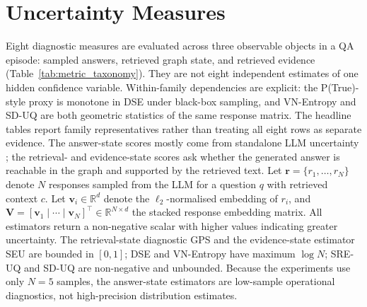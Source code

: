 \section{Uncertainty Measures}
\label{sec:metrics}

Eight diagnostic measures are evaluated across three observable objects in a
QA episode: sampled answers, retrieved graph state, and retrieved evidence
(Table~\ref{tab:metric_taxonomy}).
They are not eight independent estimates of one hidden confidence variable.
Within-family dependencies are explicit: the P(True)-style proxy is monotone
in DSE under black-box sampling, and VN-Entropy and SD-UQ are both geometric
statistics of the same response matrix.
The headline tables report family representatives rather than treating all
eight rows as separate evidence.
The answer-state scores mostly come from standalone LLM uncertainty
\citep{kuhn2023semantic,manakul2023selfcheckgpt,kadavath2022language,moskvoretskii2025adaptive};
the retrieval- and evidence-state scores ask whether the generated answer is
reachable in the graph and supported by the retrieved text.
Let $\bm{r} = \{r_1,\ldots,r_N\}$ denote $N$ responses sampled from the
LLM for a question $q$ with retrieved context $c$.
Let $\bm{v}_i \in \mathbb{R}^d$ denote the $\ell_2$-normalised embedding of
$r_i$, and $\bm{V} = [\bm{v}_1\mid\cdots\mid\bm{v}_N]^\top \in \mathbb{R}^{N\times d}$
the stacked response embedding matrix.
All estimators return a non-negative scalar with higher values indicating
greater uncertainty.
The retrieval-state diagnostic GPS and the evidence-state estimator SEU are
bounded in $[0,1]$; DSE and VN-Entropy have maximum $\log N$; SRE-UQ and
SD-UQ are non-negative and unbounded.
Because the experiments use only $N=5$ samples, the answer-state estimators are
low-sample operational diagnostics, not high-precision distribution estimates.

